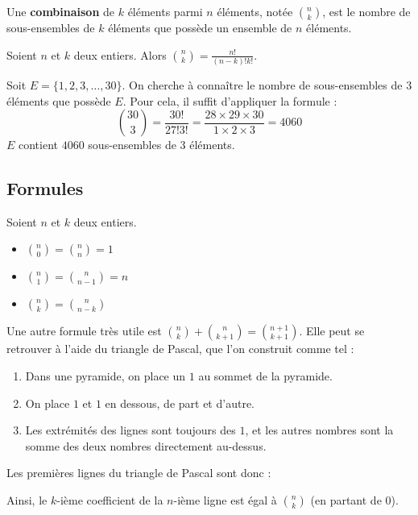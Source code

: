 	\begin{formula}[Définition]
		Une \textbf{combinaison} de $k$ éléments parmi $n$ éléments, notée $\binom{n}{k}$, est le nombre de sous-ensembles de $k$ éléments que possède un ensemble de $n$ éléments.
	\end{formula}
	
	\begin{formula}
		Soient $n$ et $k$ deux entiers. Alors $\binom{n}{k} = \frac{n!}{(n-k)!k!}$.
	\end{formula}
	
	\begin{tip}[Exemple]
		Soit $E = \{1, 2, 3, \dots, 30 \}$. On cherche à connaître le nombre de sous-ensembles de $3$ éléments que possède $E$. Pour cela, il suffit d'appliquer la formule :
		\[ \binom{30}{3} = \frac{30!}{27!3!} = \frac{28 \times 29 \times 30}{1 \times 2 \times 3} = 4060 \]
		$E$ contient $4060$ sous-ensembles de $3$ éléments.
	\end{tip}
	
	\subsection{Formules}
	
	\begin{formula}[Formules]
		Soient $n$ et $k$ deux entiers.
		\begin{itemize}
			\item $\binom{n}{0} = \binom{n}{n} = 1$
			\item $\binom{n}{1} = \binom{n}{n-1} = n$
			\item $\binom{n}{k} = \binom{n}{n-k}$
		\end{itemize}
	\end{formula}
	
	\begin{tip}
		Une autre formule très utile est $\binom{n}{k} + \binom{n}{k+1} = \binom{n+1}{k+1}$. Elle peut se retrouver à l'aide du triangle de Pascal, que l'on construit comme tel :
		\begin{enumerate}
			\item Dans une pyramide, on place un $1$ au sommet de la pyramide.
			\item On place $1$ et $1$ en dessous, de part et d'autre.
			\item Les extrémités des lignes sont toujours des $1$, et les autres nombres sont la somme des deux nombres directement au-dessus.
		\end{enumerate}
		Les premières lignes du triangle de Pascal sont donc :
		
		Ainsi, le $k$-ième coefficient de la $n$-ième ligne est égal à $\binom{n}{k}$ (en partant de $0$).
	\end{tip}
	
